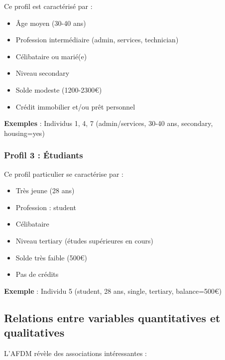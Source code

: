 \documentclass[12pt,a4paper]{article}
\begin{document}
Ce profil est caractérisé par :
\begin{itemize}
    \item Âge moyen (30-40 ans)
    \item Profession intermédiaire (admin, services, technician)
    \item Célibataire ou marié(e)
    \item Niveau secondary
    \item Solde modeste (1200-2300€)
    \item Crédit immobilier et/ou prêt personnel
\end{itemize}

\textbf{Exemples} : Individus 1, 4, 7 (admin/services, 30-40 ans, secondary, housing=yes)

\subsubsection{Profil 3 : Étudiants}

Ce profil particulier se caractérise par :
\begin{itemize}
    \item Très jeune (28 ans)
    \item Profession : student
    \item Célibataire
    \item Niveau tertiary (études supérieures en cours)
    \item Solde très faible (500€)
    \item Pas de crédits
\end{itemize}

\textbf{Exemple} : Individu 5 (student, 28 ans, single, tertiary, balance=500€)

\subsection{Relations entre variables quantitatives et qualitatives}

L'AFDM révèle des associations intéressantes :
\end{document}

